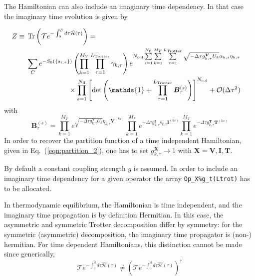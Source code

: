 
The Hamiltonian can also include an imaginary time dependency.  In that case the  imaginary  time  evolution  is given by 

\begin{align}\label{eqn:partition_time}
    Z  & \equiv    \begin{multlined}[t]   \Tr{\left( \mathcal{T} e^{-\int_{0}^{\beta} d  \tau  \hat{\mathcal{H}}(\tau) }  \right)}     =   \\
          \sum_{C}   e^{-S_0 \left( \left\{ s_{i,\tau} \right\}  \right) }     \left( \prod_{k=1}^{M_V} \prod_{\tau=1}^{L_{\mathrm{Trotter}}} \gamma_{k,\tau} \right) 
        e^{ N_{\mathrm{col}}\sum\limits_{s=1}^{N_{\mathrm{fl}}} \sum\limits_{k=1}^{M_V} \sum\limits_{\tau = 1}^{L_{\mathrm{Trotter}}}\sqrt{-\Delta \tau g^{\bm V}_{k,\tau} U_{k}}  \alpha_{k,s} \eta_{k,\tau} }  \\
\times    \prod_{s=1}^{N_{\mathrm{fl}}}\left[\det\left(  \mathds{1}     + \prod_{\tau=1}^{L_{\mathrm{Trotter}}}   
	\bm{B}_{\tau}^{(s)}
     \right) \right]^{N_{\mathrm{col}}} + \mathcal{O}(\Delta\tau^{2})  \end{multlined}   %
\end{align}
with
\begin{equation}
\label{Btau_time}
	\bm{B}_{\tau}^{(s)} =   
    \prod_{k=1}^{M_V}   e^{  \sqrt{ -\Delta \tau g^{\bm V}_{k,\tau} U_{k}} \eta_{k,\tau} {\bm V}^{(ks)} }   \prod_{k=1}^{M_I}   e^{  -\Delta \tau g^{\bm I}_{k,\tau} s_{k,\tau}  {\bm I}^{(ks)}}  
     \prod_{k=1}^{M_T}   e^{-\Delta \tau g^{\bm T}_{k,\tau} {\bm T}^{(ks)}} 
\end{equation}
In order to recover the partition function of a time independent Hamiltonian, given in Eq.~(\ref{eqn:partition_2}), one has to set $g^{\bm X}_{k,\tau}\rightarrow 1$ with ${\bm X}={\bm V}, {\bm I}, {\bm T}$.

By default a constant coupling strength $g$ is assumed. In order to include an imaginary time dependency for a given operator the array  \texttt{Op\_X\%g\_t(Ltrot)} has to be allocated.

In thermodynamic  equilibrium,   the   Hamiltonian  is  time   independent,  and  the  imaginary  time  propagation is by   definition  Hermitian.   In this  case,     the   asymmetric  and  symmetric  Trotter  decomposition   differ  by  symmetry:  for   the   symmetric  (asymmetric)  decomposition,  the  imaginary  time  propagator  is  (non-) hermitian.   For  time  dependent  Hamiltonians,  this    distinction  cannot  be  made  since   generically,  
\begin{equation}
	 \mathcal{T} e^{-\int_{0}^{\beta} d  \tau  \hat{\mathcal{H}}(\tau) }   \neq   \left( \mathcal{T} e^{-\int_{0}^{\beta} d  \tau  \hat{\mathcal{H}}(\tau) }  \right)^\dagger
\end{equation}

